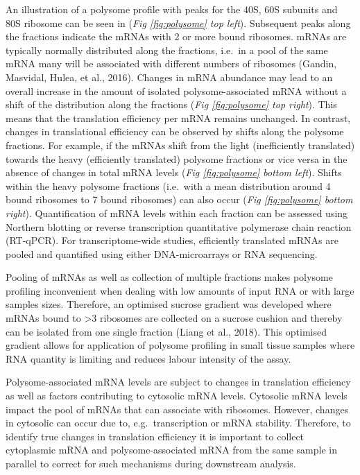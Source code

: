 \documentclass[
  12pt,
  openany]{book}
\begin{document}
An illustration of a polysome profile with peaks for the 40S, 60S subunits and 80S ribosome can be seen in (\emph{Fig \ref{fig:polysome} top left}). Subsequent peaks along the fractions indicate the mRNAs with 2 or more bound ribosomes. mRNAs are typically normally distributed along the fractions, i.e.~in a pool of the same mRNA many will be associated with different numbers of ribosomes (Gandin, Masvidal, Hulea, et al., 2016). Changes in mRNA abundance may lead to an overall increase in the amount of isolated polysome-associated mRNA without a shift of the distribution along the fractions (\emph{Fig \ref{fig:polysome} top right}). This means that the translation efficiency per mRNA remains unchanged. In contrast, changes in translational efficiency can be observed by shifts along the polysome fractions. For example, if the mRNAs shift from the light (inefficiently translated) towards the heavy (efficiently translated) polysome fractions or vice versa in the absence of changes in total mRNA levels (\emph{Fig \ref{fig:polysome} bottom left}). Shifts within the heavy polysome fractions (i.e.~with a mean distribution around 4 bound ribosomes to 7 bound ribosomes) can also occur (\emph{Fig \ref{fig:polysome} bottom right}). Quantification of mRNA levels within each fraction can be assessed using Northern blotting or reverse transcription quantitative polymerase chain reaction (RT-qPCR). For transcriptome-wide studies, efficiently translated mRNAs are pooled and quantified using either DNA-microarrays or RNA sequencing.

Pooling of mRNAs as well as collection of multiple fractions makes polysome profiling inconvenient when dealing with low amounts of input RNA or with large samples sizes. Therefore, an optimised sucrose gradient was developed where mRNAs bound to \textgreater3 ribosomes are collected on a sucrose cushion and thereby can be isolated from one single fraction (Liang et al., 2018). This optimised gradient allows for application of polysome profiling in small tissue samples where RNA quantity is limiting and reduces labour intensity of the assay.

Polysome-associated mRNA levels are subject to changes in translation efficiency as well as factors contributing to cytosolic mRNA levels. Cytosolic mRNA levels impact the pool of mRNAs that can associate with ribosomes. However, changes in cytosolic can occur due to, e.g.~transcription or mRNA stability. Therefore, to identify true changes in translation efficiency it is important to collect cytoplasmic mRNA and polysome-associated mRNA from the same sample in parallel to correct for such mechanisms during downstream analysis.
\end{document}

